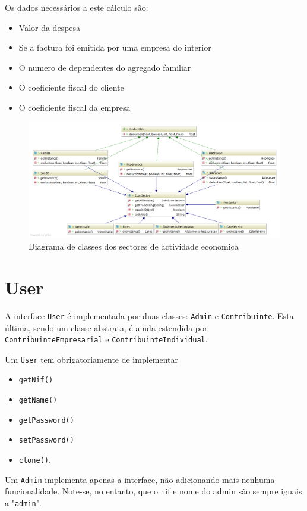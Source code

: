 \documentclass[12pt,a4paper]{report}
\begin{document}
    Os dados necessários a este cálculo são:
    \begin{itemize}
        \item Valor da despesa
        \item Se a factura foi emitida por uma empresa do interior
        \item O numero de dependentes do agregado familiar
        \item O coeficiente fiscal do cliente
        \item O coeficiente fiscal da empresa
    \end{itemize}

    \begin{figure}[h]
        \centering
        \includegraphics[width=\textwidth]{./images/econSectors.png}
        \caption{Diagrama de classes dos sectores de actividade economica}
        \label{fig:sectors}
    \end{figure}

\pagebreak

    \section{User}
    A interface \texttt{User} é implementada por duas classes:
    \texttt{Admin} e \texttt{Contribuinte}. Esta última, sendo
    um classe abstrata, é ainda estendida por
    \texttt{ContribuinteEmpresarial} e
    \texttt{ContribuinteIndividual}.

    Um \texttt{User} tem obrigatoriamente de implementar
    \begin{multicols}{3}
    \begin{itemize}
        \item \texttt{getNif()}
        \item \texttt{getName()}
        \item \texttt{getPassword()}
        \item \texttt{setPassword()}
        \item \texttt{clone()}.
    \end{itemize}
    \end{multicols}
    Um \texttt{Admin} implementa apenas a interface, não adicionando mais
    nenhuma funcionalidade. Note-se, no entanto, que o nif e nome do admin são
    sempre iguais a "\texttt{admin}".
\end{document}
